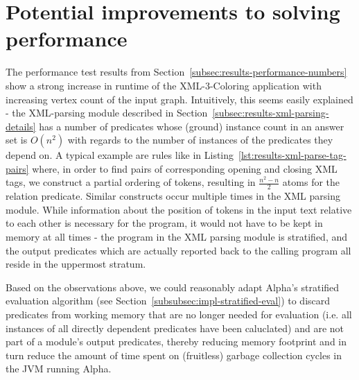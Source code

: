 \section{Potential improvements to solving performance}

The performance test results from Section~\ref{subsec:results-performance-numbers} show a strong increase in runtime of the XML-3-Coloring application with increasing vertex count of the input graph. Intuitively, this seems easily explained - the XML-parsing module described in Section~\ref{subsec:results-xml-parsing-details} has a number of predicates whose (ground) instance count in an answer set is $O(n^2)$ with regards to the number of instances of the predicates they depend on. A typical example are rules like in Listing~\ref{lst:results-xml-parse-tag-pairs} where, in order to find pairs of corresponding opening and closing XML tags, we construct a partial ordering of tokens, resulting in $\frac{n^2 - n}{2}$ atoms for the relation predicate. Similar constructs occur multiple times in the XML parsing module. While information about the position of tokens in the input text relative to each other is necessary for the program, it would not have to be kept in memory at all times - the program in the XML parsing module is stratified, and the output predicates which are actually reported back to the calling program all reside in the uppermost stratum.

Based on the observations above, we could reasonably adapt Alpha's stratified evaluation algorithm (see Section~\ref{subsubsec:impl-stratified-eval}) to discard predicates from working memory that are no longer needed for evaluation (i.e. all instances of all directly dependent predicates have been caluclated) and are not part of a module's output predicates, thereby reducing memory footprint and in turn reduce the amount of time spent on (fruitless) garbage collection cycles in the JVM running Alpha.